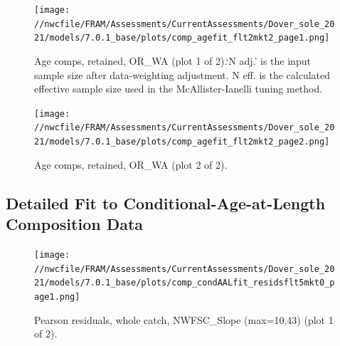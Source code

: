 \documentclass[11pt,
  english,
  a4paper,
]{article}
\begin{document}
\tagmcend\tagstructend


\begin{figure}
\centering
\texttt{[image: //nwcfile/FRAM/Assessments/CurrentAssessments/Dover\_sole\_2021/models/7.0.1\_base/plots/comp\_agefit\_flt2mkt2\_page1.png]}
\caption{Age comps, retained, OR\_WA (plot 1 of 2).`N adj.' is the input sample size after data-weighting adjustment. N eff. is the calculated effective sample size used in the McAllister-Ianelli tuning method.\label{fig:comp_agefit_flt2mkt2_page1}}
\end{figure}

\tagmcend\tagstructend


\begin{figure}
\centering
\texttt{[image: //nwcfile/FRAM/Assessments/CurrentAssessments/Dover\_sole\_2021/models/7.0.1\_base/plots/comp\_agefit\_flt2mkt2\_page2.png]}
\caption{Age comps, retained, OR\_WA (plot 2 of 2).\label{fig:comp_agefit_flt2mkt2_page2}}
\end{figure}

\tagmcend\tagstructend

\clearpage


\hypertarget{detailed-caal}{%
\subsection{Detailed Fit to Conditional-Age-at-Length Composition Data}\label{detailed-caal}}

\leavevmode\tagmcend\tagstructend


\begin{figure}
\centering
\texttt{[image: //nwcfile/FRAM/Assessments/CurrentAssessments/Dover\_sole\_2021/models/7.0.1\_base/plots/comp\_condAALfit\_residsflt5mkt0\_page1.png]}
\caption{Pearson residuals, whole catch, NWFSC\_Slope (max=10.43) (plot 1 of 2).\label{fig:comp_condAALfit_residsflt5mkt0_page1}}
\end{figure}
\end{document}
